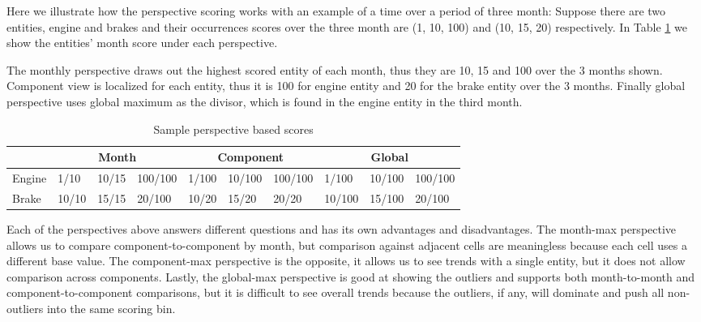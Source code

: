 Here we illustrate how the perspective scoring works with an example of a time
over a period of three month: Suppose there are two entities, engine and brakes
and their occurrences scores over the three month are (1, 10, 100) and (10, 15,
20) respectively. In Table \ref{table:perspective} we show the entities' month
score under each perspective.

The monthly perspective draws out the
highest scored entity of each month, thus they are 10, 15 and 100 over the 3
months shown. Component view is localized for each entity, thus it is 100 for
engine entity and 20 for the brake entity over the 3 months. Finally global
perspective uses global maximum as the divisor, which is found in the engine
entity in the third month. 
 
    \begin{table}[h]
	\begin{tabular}{| l | lll | lll | lll | 
	      } 
	   \hline
	   & \multicolumn{3}{|c|}{Month} 
	   & \multicolumn{3}{|c|}{Component} 
	   & \multicolumn{3}{|c|}{Global} \\
	   
	   \hline
	   Engine & %
	            1/10 & 10/15 & 100/100 &      %
	            1/100 & 10/100 & 100/100 &    %
	            1/100 & 10/100 & 100/100 \\   %
	            
	   Brake &  %
	            10/10 & 15/15 & 20/100 &      %
	            10/20 & 15/20 & 20/20  &      %
	            10/100 & 15/100 & 20/100 \\   %
	   \hline
	\end{tabular} 
	\caption{Sample perspective based scores} 
	\label{table:perspective}
	\end{table}
  
Each of the perspectives above answers different questions and has its own
advantages and disadvantages. The month-max perspective allows us to compare 
component-to-component by month, but comparison against adjacent cells are 
meaningless because each cell uses a different base value. The component-max 
perspective is the opposite, it allows us to see trends with a single entity, 
but it does not allow comparison across components. Lastly, the global-max 
perspective is good at showing the outliers and supports both month-to-month 
and component-to-component comparisons, but it is difficult to see overall
trends because the outliers, if any, will dominate and push all non-outliers
into the same scoring bin.

